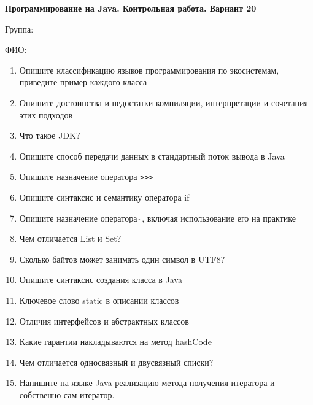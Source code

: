 \documentclass[12pt]{article}
\begin{document}
\newpage\begin{minipage}{\textwidth}
\textbf{Программирование на Java. Контрольная работа. Вариант 20}

Группа: \underline{\hspace{3cm}}

ФИО: \underline{\hspace{10cm}}

\begin{enumerate}
\item Опишите классификацию языков программирования по экосистемам, приведите пример каждого класса
\item Опишите достоинства и недостатки компиляции, интерпретации и сочетания этих подходов
\item Что такое JDK?
\item Опишите способ передачи данных в стандартный поток вывода в Java
\item Опишите назначение оператора \verb|>>>|
\item Опишите синтаксис и семантику оператора if
\item Опишите назначение оператора $\hat{\ }$, включая использование его на практике
\item Чем отличается List и Set?
\item Сколько байтов может занимать один символ в UTF8?
\item Опишите синтаксис создания класса в Java
\item Ключевое слово static в описании классов
\item Отличия интерфейсов и абстрактных классов
\item Какие гарантии накладываются на метод hashCode
\item Чем отличается односвязный и двусвязный списки?
\item Напишите на языке Java реализацию метода получения итератора и собственно сам итератор.

\end{enumerate}
\end{minipage}
\end{document}
